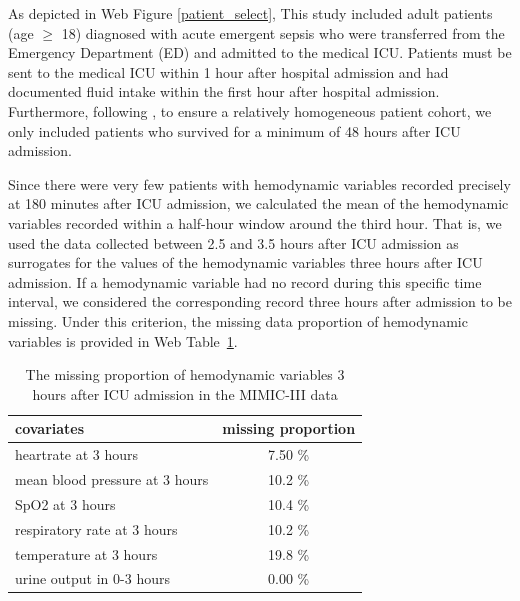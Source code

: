 \documentclass[12pt]{article}
\begin{document}
As depicted in Web Figure \ref{patient_select}, This study included adult patients (age $\geq$ 18) diagnosed with acute emergent sepsis who were transferred from the Emergency Department (ED) and admitted to the medical ICU. Patients must be sent to the medical ICU within 1 hour after hospital admission and had documented fluid intake within the first hour after hospital admission. Furthermore, following \cite{Speth_et_al_2022}, to ensure a relatively homogeneous patient cohort, we only included patients who survived for a minimum of 48 hours after ICU admission. 

Since there were very few patients with hemodynamic variables recorded precisely at 180 minutes after ICU admission, we calculated the mean of the hemodynamic variables recorded within a half-hour window around the third hour. That is, we used the data collected between 2.5 and 3.5 hours after ICU admission as surrogates for the values of the hemodynamic variables three hours after ICU admission. If a hemodynamic variable had no record during this specific time interval, we considered the corresponding record three hours after admission to be missing. Under this criterion, the missing data proportion of hemodynamic variables is provided in Web Table~\ref{missingtable}.

\begin{table}[htbp]
    \centering
    \caption{The missing proportion of hemodynamic variables 3 hours after ICU admission in the MIMIC-III data}
    \begin{tabular}{lc}
    \hline
        covariates &  missing proportion\\
        \hline 
        heartrate at 3 hours & 7.50 \% \\
        mean blood pressure at 3 hours & 10.2 \%  \\
        SpO2 at 3 hours  & 10.4 \% \\
        respiratory rate at 3 hours & 10.2 \% \\
        temperature at 3 hours & 19.8 \% \\
        urine output in 0-3 hours & 0.00 \% \\
    \hline
    \end{tabular}
    \label{missingtable}
\end{table}
\end{document}
